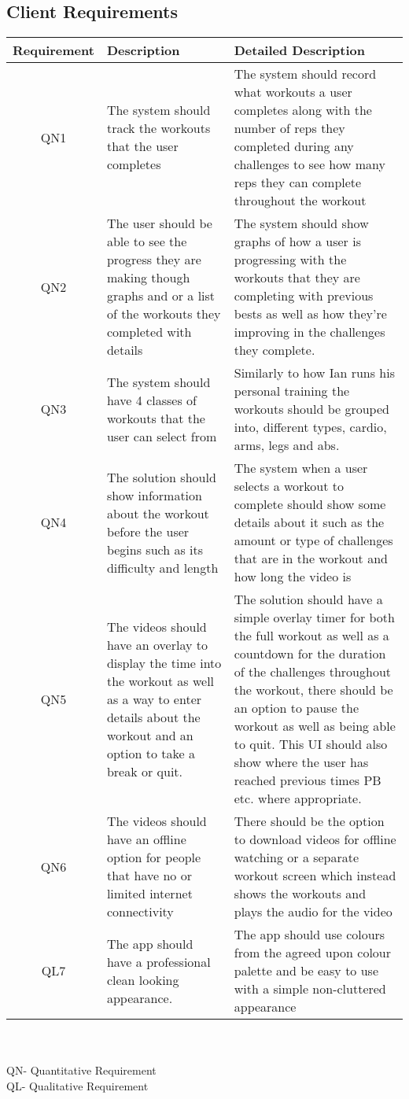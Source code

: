 \documentclass[a4paper]{article}
\begin{document}
	\subsection{Client Requirements}
	\begin{tabular}{| c | L{4cm} | L{8cm} |}
	\hline
		Requirement & Description & Detailed Description\\ \hline
	QN1&
	The system should track the workouts that the user completes &
	The system should record what workouts a user completes along with the number of reps they completed during any challenges to see how many reps they can complete throughout the workout \\
	\hline
	QN2&
	The user should be able to see the progress they are making though graphs and or a list of the workouts they completed with details&
	The system should show graphs of how a user is progressing with the workouts that they are completing with previous bests as well as how they’re improving in the challenges they complete. \\
	\hline
    QN3&
    The system should have 4 classes of workouts that the user can select from &
    Similarly to how Ian runs his personal training the workouts should be grouped into, different types, cardio, arms, legs and abs. \\
    \hline
    QN4&
    The solution should show information about the workout before the user begins such as its difficulty and length&
    The system when a user selects a workout to complete should show some details about it such as the amount or type of challenges that are in the workout and how long the video is \\
    \hline
    QN5&
    The videos should have an overlay to display the time into the workout as well as a way to enter details about the workout and an option to take a break or quit.&
    The solution should have a simple overlay timer for both the full workout as well as a countdown for the duration of the challenges throughout the workout, there should be an option to pause the workout as well as being able to quit. This UI should also show where the user has reached previous times PB etc. where appropriate. \\
    \hline
    QN6&
   	The videos should have an offline option for people that have no or limited internet connectivity&
    There should be the option to download videos for offline watching or a separate workout screen which instead shows the workouts and plays the audio for the video\\
    \hline
    QL7&
    The app should have a professional clean looking appearance.&
    The app should use colours from the agreed upon colour palette and be easy to use with a simple non-cluttered appearance\\
    \hline
	\end{tabular}
\\ \\
\footnotesize QN- Quantitative Requirement\\
\footnotesize QL- Qualitative Requirement
\end{document}
